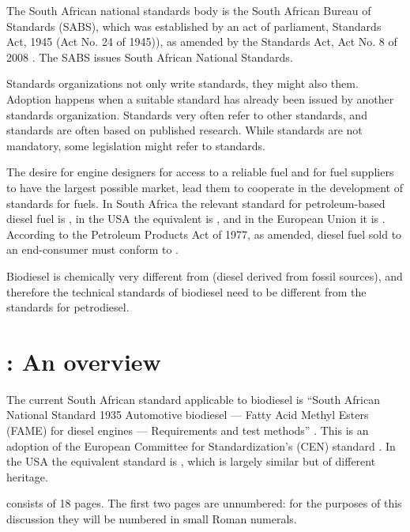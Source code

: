 The South African national standards body is the South African Bureau of
Standards (SABS), which was established by an act of parliament,
 Standards Act, 1945 (Act No. 24 of 1945)), as amended by the Standards Act, Act
 No. 8 of 2008 \autocite{Act8-2008}. The SABS issues South African National
 Standards.

Standards organizations not only write standards, they might also
 them. Adoption happens when a suitable standard has already been
issued by another standards organization. Standards very often refer to other
standards, and standards are often based on published research. While standards
are not mandatory, some legislation might refer to standards.

The desire for engine designers for access to a reliable fuel and for fuel
suppliers to have the largest possible market, lead them to cooperate in the
development of standards for fuels. In South Africa the relevant standard for
petroleum-based diesel fuel is , in the USA the equivalent is
, and in the European Union it is . According to the
Petroleum Products Act of 1977, as amended, diesel fuel sold to an end-consumer
must conform to .

Biodiesel is chemically very different from  (diesel
derived from fossil sources), and therefore the technical standards of biodiesel
need to be different from the standards for petrodiesel.

\section{\texorpdfstring{}{SANS 1935}: An overview}

The current South African standard applicable to biodiesel is ``South African
National Standard 1935 Automotive biodiesel — Fatty Acid Methyl Esters (FAME)
for diesel engines — Requirements and test methods'' \autocite{SANS1935}. This
is an adoption of the European Committee for Standardization's (CEN) standard
 \autocite{EN14214}. In the USA the equivalent standard is
, which is largely similar but of different heritage.

 consists of 18 pages. The first two pages are unnumbered: for
the purposes of this discussion they will be numbered in small Roman numerals.

